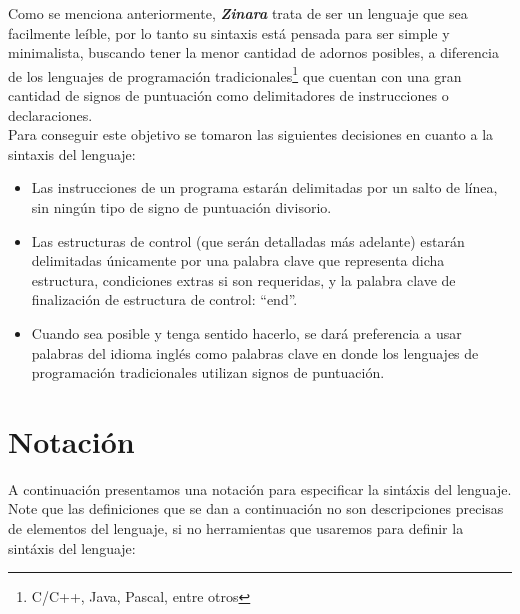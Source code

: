 \documentclass[12pt, spanish]{report}
\begin{document}
Como se menciona anteriormente, \emph{\textbf{Zinara}} trata de ser un
lenguaje que sea facilmente le\'ible, por lo tanto su sintaxis est\'a
pensada para ser simple y minimalista, buscando tener la menor
cantidad de adornos posibles, a diferencia de los lenguajes de
programaci\'on tradicionales\footnote{C/C++, Java, Pascal, entre
  otros} que cuentan con una gran cantidad de signos de puntuaci\'on
como delimitadores de instrucciones o declaraciones.\\

Para conseguir este objetivo se tomaron las siguientes decisiones en
cuanto a la sintaxis del lenguaje:

\begin{itemize}
\item Las instrucciones de un programa estar\'an delimitadas por un
  salto de l\'inea, sin ning\'un tipo de signo de puntuaci\'on
  divisorio.

\item Las estructuras de control (que ser\'an detalladas m\'as
  adelante) estar\'an delimitadas \'unicamente por una palabra clave
  que representa dicha estructura, condiciones extras si son
  requeridas, y la palabra clave de finalizaci\'on de estructura de
  control: ``end''.

\item Cuando sea posible y tenga sentido hacerlo, se dar\'a
  preferencia a usar palabras del idioma ingl\'es como palabras clave
  en donde los lenguajes de programaci\'on tradicionales utilizan
  signos de puntuaci\'on.
\end{itemize}

\section{Notaci\'on}
A continuaci\'on presentamos una notaci\'on para especificar la
sint\'axis del lenguaje.\\
\indent Note que las definiciones que se dan a
continuaci\'on no son descripciones precisas de elementos del
lenguaje, si no herramientas que usaremos para definir la sint\'axis del
lenguaje:
\end{document}
